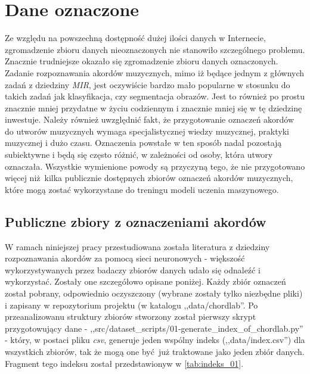 \section{Dane oznaczone}

Ze względu na powszechną dostępność dużej ilości danych w Internecie, zgromadzenie zbioru danych
nieoznaczonych nie stanowiło szczególnego problemu. Znacznie trudniejsze okazało się zgromadzenie
zbioru danych oznaczonych. Zadanie rozpoznawania akordów muzycznych, mimo iż będące jednym z
głównych zadań z dziedziny \emph{MIR}, jest oczywiście bardzo mało popularne w stosunku do takich
zadań jak klasyfikacja, czy segmentacja obrazów. Jest to również po prostu znacznie mniej przydatne
w życiu codziennym i znacznie mniej się w tę dziedzinę inwestuje. Należy również uwzględnić fakt, że
przygotowanie oznaczeń akordów do utworów muzycznych wymaga specjalistycznej wiedzy muzycznej,
praktyki muzycznej i dużo czasu. Oznaczenia powstałe w ten sposób nadal pozostają subiektywne i będą
się często różnić, w zależności od osoby, która utwory oznaczała. Wszystkie wymienione powody są
przyczyną tego, że nie przygotowano więcej niż kilka publicznie dostępnych zbiorów oznaczeń akordów
muzycznych, które mogą zostać wykorzystane do treningu modeli uczenia maszynowego.


\subsection{Publiczne zbiory z oznaczeniami akordów}

W ramach niniejszej pracy przestudiowana została literatura z dziedziny rozpoznawania akordów za
pomocą sieci neuronowych - większość wykorzystywanych przez badaczy zbiorów danych udało się
odnaleźć i wykorzystać. Zostały one szczegółowo opisane poniżej. Każdy zbiór oznaczeń został
pobrany, odpowiednio oczyszczony (wybrane zostały tylko niezbędne pliki) i zapisany w repozytorium
projektu (w katalogu ,,data/chordlab''. Po przeanalizowanu struktury zbiorów stworzony został pierwszy skrypt przygotowujący dane
- ,,src/dataset\_scripts/01-generate\_index\_of\_chordlab.py'' - który, w postaci pliku \emph{csv},
generuje jeden wspólny indeks (,,data/index.csv'') dla wszystkich zbiorów, tak że mogą one być już traktowane jako jeden
zbiór danych. Fragment tego indeksu został przedstawionyw w \ref{tab:indeks_01}.

